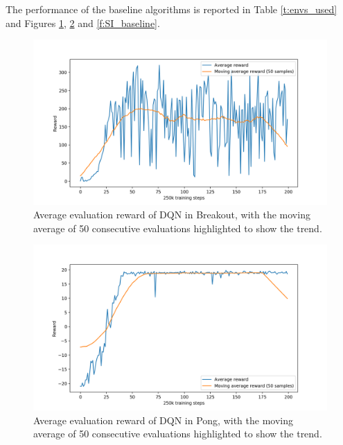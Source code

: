 The performance of the baseline algorithms is reported in Table \ref{t:envs_used} 
and Figures \ref{f:BO_baseline}, \ref{f:P_baseline} and \ref{f:SI_baseline}.
%
\begin{figure}
    \includegraphics[width=\textwidth]{pictures/experiments/baseline_breakout}
    \centering
    \caption[Average performance of DQN in Breakout]{Average evaluation reward 
	    of DQN in Breakout, with the moving average of 50 consecutive 
	    evaluations highlighted to show the trend.}
    \label{f:BO_baseline}
\end{figure}
%
%
\begin{figure}
    \includegraphics[width=\textwidth]{pictures/experiments/baseline_pong}
    \centering
    \caption[Average performance of DQN in Pong]{Average evaluation reward of 
	    DQN in Pong, with the moving average of 50 consecutive evaluations 
	    highlighted to show the trend.}
    \label{f:P_baseline}
\end{figure}
%
%
